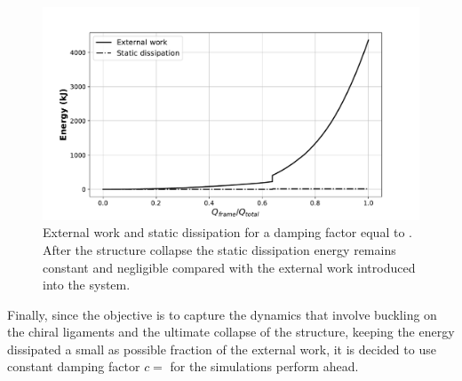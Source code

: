     \begin{figure}[!htpb]
      \centering
      \includegraphics[width=0.8 \textwidth]{figures/result-model/energy_damp-9}
      \caption[External work and static dissipation for a damping factor equal to ]{External work and static dissipation for a damping factor equal to . After the structure collapse the static dissipation energy remains constant and negligible compared with the external work introduced into the system.}\label{fig:energy_damp-9}
    \end{figure}

    Finally, since the objective is to capture the dynamics that involve buckling on the chiral ligaments and the ultimate collapse of the structure, keeping the energy dissipated a small as possible fraction of the external work, it is decided to use constant damping factor $c =$ for the simulations perform ahead. 

  \clearpage
